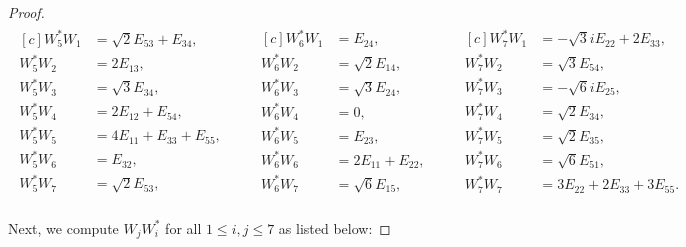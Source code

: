 \documentclass[10pt,reqno]{amsart}
\theoremstyle{definition}
\theoremstyle{plain}
\theoremstyle{remark}
\numberwithin{equation}{section}%
\begin{document}
\begin{proof}
	
	\begin{align*}
		\begin{aligned}[c]
			W_5^*W_1&=\sqrt{2}E_{53}+E_{34},\\
			W_5^*W_2&=2E_{13},\\
			W_5^*W_3&=\sqrt{3}E_{34},\\
			W_5^*W_4&=2E_{12}+E_{54},\\
			W_5^*W_5&=4E_{11}+E_{33}+E_{55},\\
			W_5^*W_6&=E_{32},\\
			W_5^*W_7&=\sqrt{2}E_{53},\\
		\end{aligned}
		\qquad
		\begin{aligned}[c]
			W_6^*W_1&=E_{24},\\
			W_6^*W_2&=\sqrt{2}E_{14},\\
			W_6^*W_3&=\sqrt{3}E_{24},\\
			W_6^*W_4&=0,\\
			W_6^*W_5&=E_{23},\\
			W_6^*W_6&=2E_{11}+E_{22},\\
			W_6^*W_7&=\sqrt{6}E_{15},\\
		\end{aligned}
		\qquad
		\begin{aligned}[c]
			W_7^*W_1&=-\sqrt{3}iE_{22}+2E_{33},\\
			W_7^*W_2&=\sqrt{3}E_{54},\\
			W_7^*W_3&=-\sqrt{6}iE_{25},\\
			W_7^*W_4&=\sqrt{2}E_{34},\\
			W_7^*W_5&=\sqrt{2}E_{35},\\
			W_7^*W_6&=\sqrt{6}E_{51},\\
			W_7^*W_7&=3E_{22}+2E_{33}+3E_{55}.\\
		\end{aligned}
	\end{align*}
	\normalsize
	
	
	
	Next, we compute $W_jW_i^*$ for all $1\leq i,j\leq 7$ as listed below:
	

\end{proof}
\end{document}
